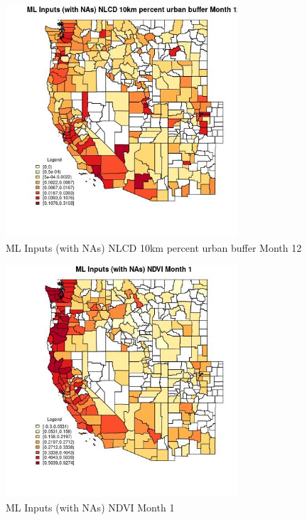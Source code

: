 \begin{figure} 
\centering  
\includegraphics[width=0.77\textwidth]{Code_Outputs/Report_ML_input_PM25_Step4_part_f_de_duplicated_aves_prioritize_24hr_obswNAs_CountyNLCD_10km_percent_urban_buffermedianMonth12.jpg} 
\caption{\label{fig:Report_ML_input_PM25_Step4_part_f_de_duplicated_aves_prioritize_24hr_obswNAsCountyNLCD_10km_percent_urban_buffermedianMonth12}ML Inputs (with NAs) NLCD 10km percent urban buffer Month 12} 
\end{figure} 
 

\begin{figure} 
\centering  
\includegraphics[width=0.77\textwidth]{Code_Outputs/Report_ML_input_PM25_Step4_part_f_de_duplicated_aves_prioritize_24hr_obswNAs_CountyNDVImedianMonth1.jpg} 
\caption{\label{fig:Report_ML_input_PM25_Step4_part_f_de_duplicated_aves_prioritize_24hr_obswNAsCountyNDVImedianMonth1}ML Inputs (with NAs) NDVI Month 1} 
\end{figure} 
 

